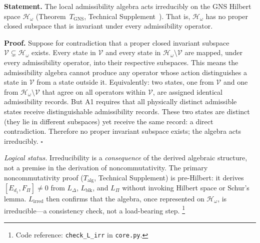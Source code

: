 \documentclass[11pt]{article}
\newcommand{\coderef}[2]{\footnote{Code reference: \texttt{#1} in \texttt{#2}.}}
\begin{document}
\begin{tcolorbox}[apfbox, title={Lemma $L_{\mathrm{irred}}$ (Irreducibility of the Derived Algebra)}]
\textbf{Statement.}  The local admissibility algebra acts irreducibly on the GNS Hilbert space $\mathcal{H}_\omega$ (Theorem~$T_{\mathrm{GNS}}$, Technical Supplement~\cite{BrookeSupplement}).  That is, $\mathcal{H}_\omega$ has no proper closed subspace that is invariant under every admissibility operator.

\smallskip\noindent\textbf{Proof.}  Suppose for contradiction that a proper closed invariant subspace $\mathcal{V} \subsetneq \mathcal{H}_\omega$ exists.  Every state in $\mathcal{V}$ and every state in $\mathcal{H}_\omega \setminus \mathcal{V}$ are mapped, under every admissibility operator, into their respective subspaces.  This means the admissibility algebra cannot produce any operator whose action distinguishes a state in $\mathcal{V}$ from a state outside it.  Equivalently: two states, one from $\mathcal{V}$ and one from $\mathcal{H}_\omega \setminus \mathcal{V}$ that agree on all operators within $\mathcal{V}$, are assigned identical admissibility records.  But A1 requires that all physically distinct admissible states receive distinguishable admissibility records.  These two states are distinct (they lie in different subspaces) yet receive the same record: a direct contradiction.  Therefore no proper invariant subspace exists; the algebra acts irreducibly.  $\square$

\smallskip\noindent\textit{Logical status.}  Irreducibility is a \emph{consequence} of the derived algebraic structure, not a premise in the derivation of noncommutativity.  The primary noncommutativity proof ($T_{\mathrm{alg}}$, Technical Supplement) is pre-Hilbert: it derives $[E_{d_1}, F_\Pi] \ne 0$ from $L_\Delta$, $L_{\mathrm{blk}}$, and $L_\Pi$ without invoking Hilbert space or Schur's lemma.  $L_{\mathrm{irred}}$ then confirms that the algebra, once represented on $\mathcal{H}_\omega$, is irreducible---a consistency check, not a load-bearing step.
\coderef{check\_L\_irr}{core.py}
\end{tcolorbox}
\end{document}
